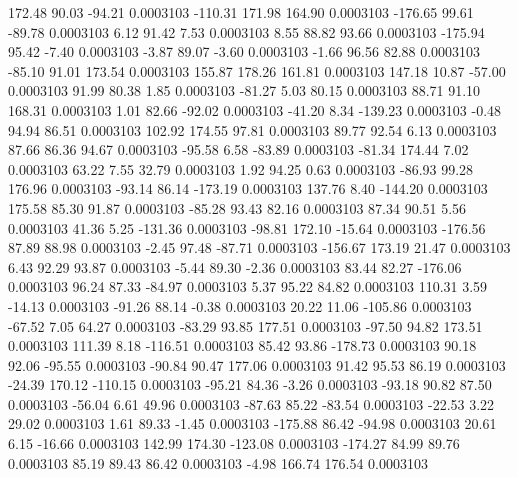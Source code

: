       172.48       90.03      -94.21     0.0003103
     -110.31      171.98      164.90     0.0003103
     -176.65       99.61      -89.78     0.0003103
        6.12       91.42        7.53     0.0003103
        8.55       88.82       93.66     0.0003103
     -175.94       95.42       -7.40     0.0003103
       -3.87       89.07       -3.60     0.0003103
       -1.66       96.56       82.88     0.0003103
      -85.10       91.01      173.54     0.0003103
      155.87      178.26      161.81     0.0003103
      147.18       10.87      -57.00     0.0003103
       91.99       80.38        1.85     0.0003103
      -81.27        5.03       80.15     0.0003103
       88.71       91.10      168.31     0.0003103
        1.01       82.66      -92.02     0.0003103
      -41.20        8.34     -139.23     0.0003103
       -0.48       94.94       86.51     0.0003103
      102.92      174.55       97.81     0.0003103
       89.77       92.54        6.13     0.0003103
       87.66       86.36       94.67     0.0003103
      -95.58        6.58      -83.89     0.0003103
      -81.34      174.44        7.02     0.0003103
       63.22        7.55       32.79     0.0003103
        1.92       94.25        0.63     0.0003103
      -86.93       99.28      176.96     0.0003103
      -93.14       86.14     -173.19     0.0003103
      137.76        8.40     -144.20     0.0003103
      175.58       85.30       91.87     0.0003103
      -85.28       93.43       82.16     0.0003103
       87.34       90.51        5.56     0.0003103
       41.36        5.25     -131.36     0.0003103
      -98.81      172.10      -15.64     0.0003103
     -176.56       87.89       88.98     0.0003103
       -2.45       97.48      -87.71     0.0003103
     -156.67      173.19       21.47     0.0003103
        6.43       92.29       93.87     0.0003103
       -5.44       89.30       -2.36     0.0003103
       83.44       82.27     -176.06     0.0003103
       96.24       87.33      -84.97     0.0003103
        5.37       95.22       84.82     0.0003103
      110.31        3.59      -14.13     0.0003103
      -91.26       88.14       -0.38     0.0003103
       20.22       11.06     -105.86     0.0003103
      -67.52        7.05       64.27     0.0003103
      -83.29       93.85      177.51     0.0003103
      -97.50       94.82      173.51     0.0003103
      111.39        8.18     -116.51     0.0003103
       85.42       93.86     -178.73     0.0003103
       90.18       92.06      -95.55     0.0003103
      -90.84       90.47      177.06     0.0003103
       91.42       95.53       86.19     0.0003103
      -24.39      170.12     -110.15     0.0003103
      -95.21       84.36       -3.26     0.0003103
      -93.18       90.82       87.50     0.0003103
      -56.04        6.61       49.96     0.0003103
      -87.63       85.22      -83.54     0.0003103
      -22.53        3.22       29.02     0.0003103
        1.61       89.33       -1.45     0.0003103
     -175.88       86.42      -94.98     0.0003103
       20.61        6.15      -16.66     0.0003103
      142.99      174.30     -123.08     0.0003103
     -174.27       84.99       89.76     0.0003103
       85.19       89.43       86.42     0.0003103
       -4.98      166.74      176.54     0.0003103
